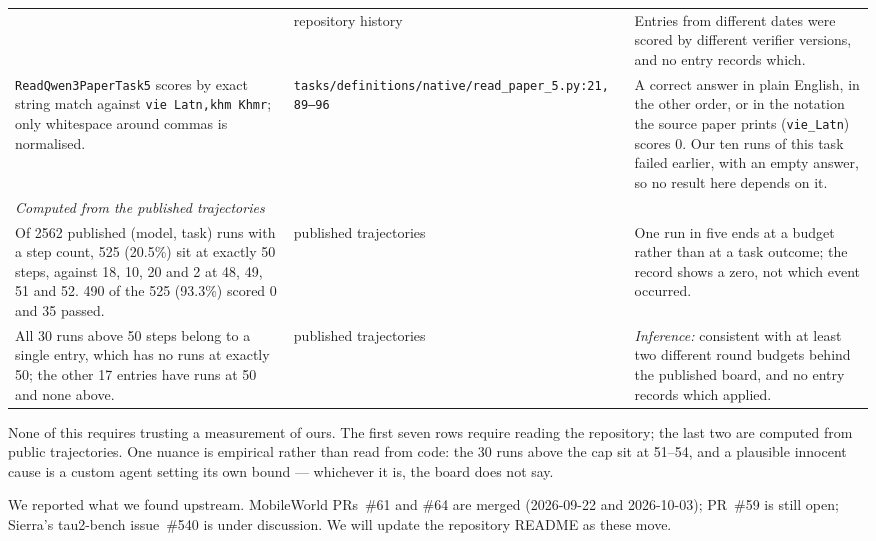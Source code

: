 \begin{table}[t]
\begin{tabular}{p{}p{}p{}}
& repository history
& Entries from different dates were scored by different verifier versions, and
no entry records which. \\
\addlinespace
\texttt{ReadQwen3PaperTask5} scores by exact string match against
\texttt{vie Latn,khm Khmr}; only whitespace around commas is normalised.
& \texttt{tasks/}\allowbreak\texttt{definitions/}\allowbreak\texttt{native/}\allowbreak\texttt{read\_paper\_5.py:}\allowbreak\texttt{21,\,89--96}
& A correct answer in plain English, in the other order, or in the notation the
source paper prints (\texttt{vie\_Latn}) scores 0. Our ten runs of this task
failed earlier, with an empty answer, so no result here depends on it. \\
\midrule
\multicolumn{3}{l}{\textit{Computed from the published trajectories}} \\
\addlinespace
Of 2562 published (model, task) runs with a step count, 525 (20.5\%) sit at
exactly 50 steps, against 18, 10, 20 and 2 at 48, 49, 51 and 52. 490 of the 525
(93.3\%) scored 0 and 35 passed.\footnotemark
& published trajectories
& One run in five ends at a budget rather than at a task outcome; the record
shows a zero, not which event occurred. \\
\addlinespace
All 30 runs above 50 steps belong to a single entry, which has no runs at
exactly 50; the other 17 entries have runs at 50 and none above.
& published trajectories
& \emph{Inference:} consistent with at least two different round budgets behind
the published board, and no entry records which applied. \\
\bottomrule
\end{tabular}
\end{table}

None of this requires trusting a measurement of ours. The first seven rows
require reading the repository; the last two are computed from public
trajectories. One nuance is empirical rather than read from code: the 30 runs
above the cap sit at 51--54, and a plausible innocent cause is a custom agent
setting its own bound --- whichever it is, the board does not say.

We reported what we found upstream. MobileWorld PRs~\#61 and \#64 are merged
(2026-09-22 and 2026-10-03); PR~\#59 is still open; Sierra's tau2-bench
issue~\#540 is under discussion. We will update the repository README as these move.
